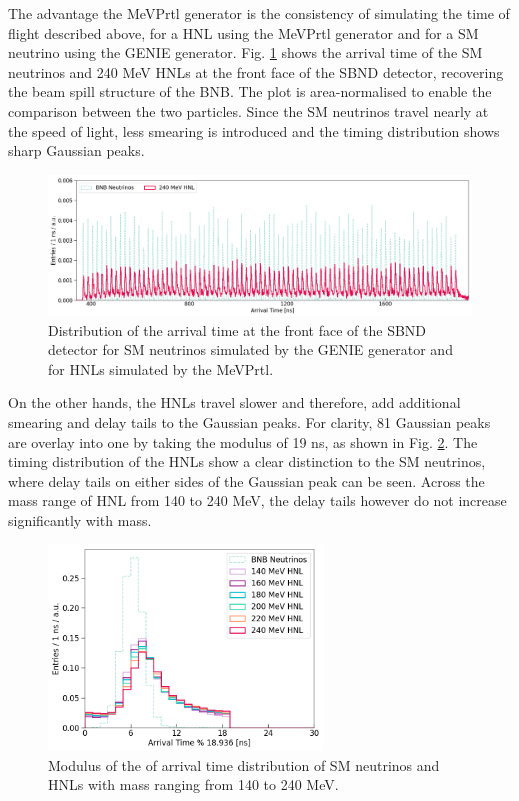 The advantage the MeVPrtl generator is the consistency of simulating the time of flight described above, for a HNL using the MeVPrtl generator and for a SM neutrino using the GENIE generator.
Fig. \ref{fig:full_beam} shows the arrival time of the SM neutrinos and 240 MeV HNLs at the front face of the SBND detector, recovering the beam spill structure of the BNB.
The plot is area-normalised to enable the comparison between the two particles. 
Since the SM neutrinos travel nearly at the speed of light, less smearing is introduced and the timing distribution shows sharp Gaussian peaks.
\begin{figure}[bp!] 
\centering    
\includegraphics[width=1.0\textwidth]{full_beam}
\caption[full_beam]{
Distribution of the arrival time at the front face of the SBND detector for SM neutrinos simulated by the GENIE generator and for HNLs simulated by the MeVPrtl. 
}
\label{fig:full_beam}
\end{figure}
On the other hands, the HNLs travel slower and therefore, add additional smearing and delay tails to the Gaussian peaks.
For clarity, 81 Gaussian peaks are overlay into one by taking the modulus of 19 ns, as shown in Fig. \ref{fig:beam_modulus}.
The timing distribution of the HNLs show a clear distinction to the SM neutrinos, where delay tails on either sides of the Gaussian peak can be seen.
Across the mass range of HNL from 140 to 240 MeV, the delay tails however do not increase significantly with mass. 

\begin{figure}[htbp!] 
\centering    
\includegraphics[width=0.65\textwidth]{beam_modulus}
\caption[beam_modulus]{
Modulus of the of arrival time distribution of SM neutrinos and HNLs with mass ranging from 140 to 240 MeV. 
}
\label{fig:beam_modulus}
\end{figure}

